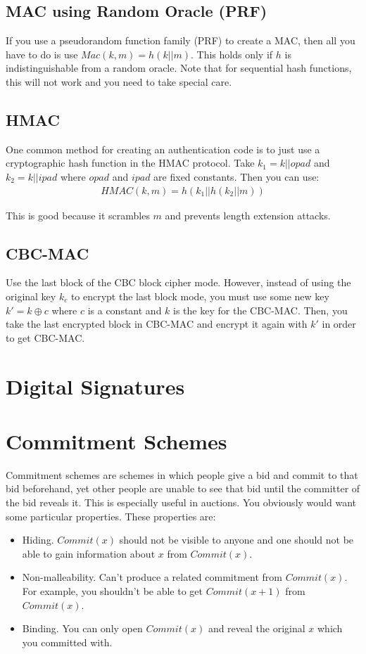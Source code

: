 \documentclass[psamsfonts]{amsart}
\begin{document}
\subsection{MAC using Random Oracle (PRF)}

If you use a pseudorandom function family (PRF) to create a MAC, then all you have to do is use $Mac(k, m) = h(k || m)$. This holds only if $h$ is indistinguishable from a random oracle. Note that for sequential hash functions, this will not work and you need to take special care.

\subsection{HMAC}

One common method for creating an authentication code is to just use a cryptographic hash function in the HMAC protocol. Take $k_1 = k || opad$ and $k_2 = k || ipad$ where $opad$ and $ipad$ are fixed constants. Then you can use:
\begin{eqnarray}
  HMAC(k, m) = h(k_1 || h(k_2 || m))
\end{eqnarray}

This is good because it scrambles $m$ and prevents length extension attacks.

\subsection{CBC-MAC}

Use the last block of the CBC block cipher mode. However, instead of using the original key $k_c$ to encrypt the last block mode, you must use some new key $k' = k \oplus c$ where $c$ is a constant and $k$ is the key for the CBC-MAC. Then, you take the last encrypted block in CBC-MAC and encrypt it again with $k'$ in order to get CBC-MAC.

\newpage

\section{Digital Signatures}


\section{Commitment Schemes}

Commitment schemes are schemes in which people give a bid and commit to that bid beforehand, yet other people are unable to see that bid until the committer of the bid reveals it. This is especially useful in auctions. You obviously would want some particular properties. These properties are:
\begin{itemize}
  \item Hiding. $Commit(x)$ should not be visible to anyone and one should not be able to gain information about $x$ from $Commit(x)$.
  \item Non-malleability. Can't produce a related commitment from $Commit(x)$. For example, you shouldn't be able to get $Commit(x+1)$ from $Commit(x)$.
  \item Binding. You can only open $Commit(x)$ and reveal the original $x$ which you committed with.
\end{itemize}
\end{document}
